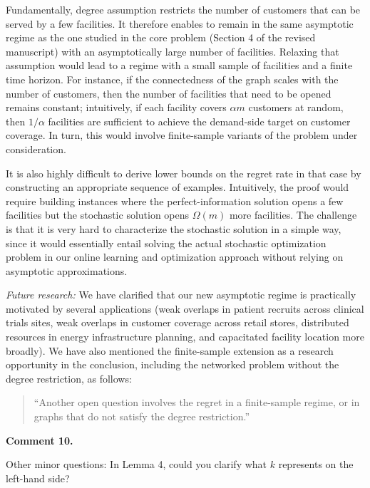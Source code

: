 \documentclass[11pt]{article}
\begin{document}
Fundamentally, degree assumption restricts the number of customers that can be served by a few facilities. It therefore enables to remain in the same asymptotic regime as the one studied in the core problem (Section 4 of the revised manuscript) with an asymptotically large number of facilities. Relaxing that assumption would lead to a regime with a small sample of facilities and a finite time horizon. For instance, if the connectedness of the graph scales with the number of customers, then the number of facilities that need to be opened remains constant; intuitively, if each facility covers $\alpha m$ customers at random, then $1/\alpha$ facilities are sufficient to achieve the demand-side target on customer coverage. In turn, this would involve finite-sample variants of the problem under consideration.

It is also highly difficult to derive lower bounds on the regret rate in that case by constructing an appropriate sequence of examples. Intuitively, the proof would require building instances where the perfect-information solution opens a few facilities but the stochastic solution opens $\Omega(m)$ more facilities. The challenge is that it is very hard to characterize the stochastic solution in a simple way, since it would essentially entail solving the actual stochastic optimization problem in our online learning and optimization approach without relying on asymptotic approximations.

\textit{Future research:} We have clarified that our new asymptotic regime is practically motivated by several applications (weak overlaps in patient recruits across clinical trials sites, weak overlaps in customer coverage across retail stores, distributed resources in energy infrastructure planning, and capacitated facility location more broadly). We have also mentioned the finite-sample extension as a research opportunity in the conclusion, including the networked problem without the degree restriction, as follows:
\begin{quote}
    ``Another open question involves the regret in a finite-sample regime, or in graphs that do not satisfy the degree restriction.''
\end{quote}

\begin{commentBox}
    \textbf{Comment 10.}\label{R2:10}

    Other minor questions: In Lemma 4, could you clarify what $k$ represents on the left-hand side?
\end{commentBox}
\end{document}
